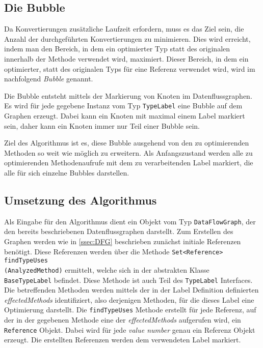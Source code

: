 \subsection{Die Bubble}

Da Konvertierungen zusätzliche Laufzeit erfordern, muss es das Ziel sein, die Anzahl 
der durchgeführten Konvertierungen zu minimieren. Dies wird erreicht, indem man den
Bereich, in dem ein optimierter Typ statt des originalen innerhalb der Methode 
verwendet wird, maximiert. Dieser Bereich, in dem ein optimierter, statt des originalen 
Typs für eine Referenz verwendet wird, wird im nachfolgend \textit{Bubble} genannt. 

Die Bubble entsteht mittels der Markierung von Knoten im Datenflussgraphen. Es wird 
für jede gegebene Instanz vom Typ \texttt{TypeLabel} eine Bubble auf dem Graphen 
erzeugt. Dabei kann ein Knoten mit maximal einem Label markiert sein, daher kann
ein Knoten immer nur Teil einer Bubble sein.

Ziel des Algorithmus ist es, diese Bubble ausgehend von den zu optimierenden Methoden 
so weit wie möglich zu erweitern. Als Anfangszustand werden alle zu optimierenden 
Methodenaufrufe mit dem zu verarbeitenden Label markiert, die alle für sich einzelne
Bubbles darstellen.

\subsection{Umsetzung des Algorithmus}\label{ssec:umAlg}

Als Eingabe für den Algorithmus dient ein Objekt vom Typ \texttt{DataFlowGraph}, der 
den bereits beschriebenen Datenflussgraphen darstellt. Zum Erstellen des Graphen werden
wie in \ref{ssec:DFG} beschrieben zunächst initiale Referenzen benötigt. Diese Referenzen
werden über die Methode \texttt{Set<Reference>} \texttt{findTypeUses\\(AnalyzedMethod)} ermittelt, 
welche sich in der abstrakten Klasse \\\texttt{BaseTypeLabel} befindet. Diese Methode ist auch Teil des 
\texttt{TypeLabel} Interfaces. Die betreffenden Methoden werden mittels der in der Label 
Definition definierten \textit{effectedMethods} identifiziert, also derjenigen Methoden, für die dieses 
Label eine Optimierung darstellt. Die \texttt{findTypeUses} Methode erstellt für jede 
Referenz, auf der in der gegebenen Methode eine der \textit{effectedMethods} aufgerufen 
wird, ein \texttt{Reference} Objekt. Dabei wird für jede \textit{value number} genau ein Referenz 
Objekt erzeugt. Die erstellten Referenzen werden dem verwendeten Label markiert.

